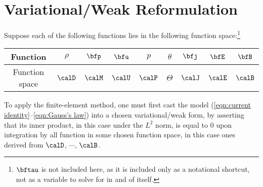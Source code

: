 \section{Variational/Weak Reformulation}

    Suppose each of the following functions lies in the following function space:\footnote{$\bftau$ is not included here, as it is included only as a notational shortcut, not as a variable to solve for in and of itself.} 
    \begin{center}\begin{tabular}{ c || c : c c : c c | c | c c }
        Function  &  $\rho$  &  $\bfp$  &  $\bfu$  &  $p$  &  $\theta$ 
         &  $\bfj$  &  $\bfE$  &  $\bfB$  \\
        \hline
        Function space  &  $\calD$  &  $\calM$  &  $\calU$  &  $\calP$  &  $\Theta$  &  $\calJ$  &  $\calE$  &  $\calB$  \\
    \end{tabular}\end{center}
    
    To apply the finite-element method, one must first cast the model (\ref{eqn:current identity}--\ref{eqn:Gauss's law}) into a chosen variational/weak form, by asserting that its inner product, in this case under the $L^{2}$ norm, is equal to $0$ upon integration by all function in some chosen function space, in this case ones derived from $\calD$, $\cdots$, $\calB$.


    
    
    
